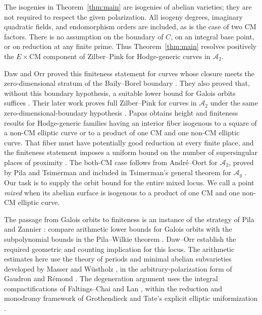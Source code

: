 \documentclass[11pt,a4paper]{article}
\numberwithin{equation}{section}
\theoremstyle{definition}
\theoremstyle{remark}
\newcommand{\A}{\mathcal A}
\newcommand{\CM}{\mathrm{CM}}
\begin{document}
The isogenies in Theorem~\ref{thm:main} are
isogenies of abelian varieties; they are not required to respect the
given polarization. All isogeny degrees, imaginary quadratic fields,
and endomorphism orders are included, as is the case of two CM factors.
There is no assumption on the boundary of \(C\), on an integral base
point, or on reduction at any finite prime. Thus
Theorem~\ref{thm:main} resolves positively the \(E\times\CM\) component
of Zilber--Pink for Hodge-generic curves in \(\A_2\).

Daw and Orr proved this finiteness statement for curves whose closure
meets the zero-dimensional stratum of the Baily--Borel boundary
\cite[Theorem~1.1]{DO}. They also proved that, without this boundary
hypothesis, a suitable lower bound for Galois orbits suffices
\cite[Theorem~1.2]{DO}. Their later work proves full Zilber--Pink
for curves in \(\A_2\) under the same zero-dimensional-boundary
hypothesis \cite[Corollary~1.2]{DOMultiplicative}.
Papas obtains height and finiteness results for Hodge-generic families
having an interior fiber isogenous to a square of a non-CM elliptic curve
or to a product of one CM and one non-CM elliptic curve. That fiber must have
potentially good reduction at every finite place, and the finiteness
statement imposes a uniform bound on the number of supersingular
places of proximity \cite[Theorem~1.5 and Corollary~1.6]{Papas}.
The both-CM case follows
from Andr\'e--Oort for \(\A_2\), proved by Pila and Tsimerman
\cite[Theorem~1.1]{PT} and included in Tsimerman's general theorem
for \(\A_g\) \cite[Theorem~5.3]{Tsimerman}.
Our task is to supply the orbit bound
for the entire mixed locus. We call a point \emph{mixed} when its
abelian surface is isogenous to a product of one CM and one non-CM
elliptic curve.

The passage from Galois orbits to finiteness is an instance of the
strategy of Pila and Zannier \cite{PZ}: compare arithmetic lower bounds
for Galois orbits with the subpolynomial bounds in the Pila--Wilkie
theorem \cite{PW}. Daw--Orr establish the required geometric and
counting implication for this locus. The arithmetic estimates here
use the theory of periods and minimal abelian subvarieties developed
by Masser and W\"ustholz \cite{MW}, in the arbitrary-polarization
form of Gaudron and R\'emond \cite{GR}. The degeneration argument
uses the integral compactifications of Faltings--Chai and Lan
\cite{FC,Lan}, within the reduction and monodromy framework of
Grothendieck \cite{SGA7} and Tate's explicit elliptic uniformization
\cite{Tate}.
\end{document}
